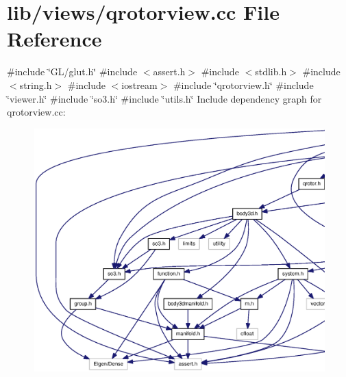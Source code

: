 \section{lib/views/qrotorview.cc \-File \-Reference}
\label{qrotorview_8cc}
{\ttfamily \#include \char`\"{}\-G\-L/glut.\-h\char`\"{}}\*
{\ttfamily \#include $<$assert.\-h$>$}\*
{\ttfamily \#include $<$stdlib.\-h$>$}\*
{\ttfamily \#include $<$string.\-h$>$}\*
{\ttfamily \#include $<$iostream$>$}\*
{\ttfamily \#include \char`\"{}qrotorview.\-h\char`\"{}}\*
{\ttfamily \#include \char`\"{}viewer.\-h\char`\"{}}\*
{\ttfamily \#include \char`\"{}so3.\-h\char`\"{}}\*
{\ttfamily \#include \char`\"{}utils.\-h\char`\"{}}\*
\-Include dependency graph for qrotorview.\-cc\-:\nopagebreak
\begin{figure}[H]
\begin{center}
\leavevmode
\includegraphics[width=350pt]{qrotorview_8cc__incl}
\end{center}
\end{figure}
